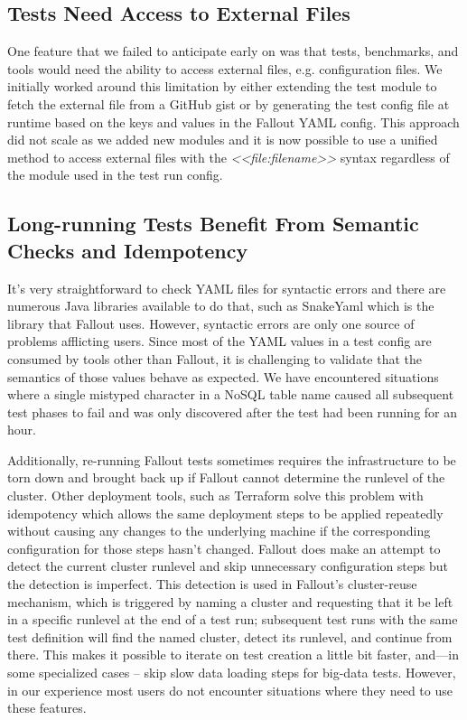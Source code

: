 \documentclass[a4paper,fleqn]{cas-dc}
\begin{document}
\subsection{Tests Need Access to External Files}

One feature that we failed to anticipate early on was that tests, benchmarks, and tools would need
the ability to access external files, e.g. configuration files. We initially worked around this
limitation by either extending the test module to fetch the external file from a GitHub gist or by
generating the test config file at runtime based on the keys and values in the Fallout YAML config.
This approach did not scale as we added new modules and it is now possible to use a unified method
to access external files with the \emph{<<file:filename>>} syntax regardless of the module used in
the test run config.

\subsection{Long-running Tests Benefit From Semantic Checks and Idempotency}


It's very straightforward to check YAML files for syntactic errors and there are numerous Java
libraries available to do that, such as SnakeYaml \cite{SNAKE} which is the library that Fallout uses.
However, syntactic errors are only one source of problems afflicting users. Since most of the YAML
values in a test config are consumed by tools other than Fallout, it is challenging to validate that
the semantics of those values behave as expected. We have encountered situations where a single
mistyped character in a NoSQL table name caused all subsequent test phases to fail and was only
discovered after the test had been running for an hour.

Additionally, re-running Fallout tests sometimes requires the infrastructure to be torn down and
brought back up if Fallout cannot determine the runlevel of the cluster. Other deployment tools,
such as Terraform \cite{TERRAFORM} solve this problem with idempotency which allows the same deployment
steps to be applied repeatedly without causing any changes to the underlying machine if the
corresponding configuration for those steps hasn’t changed. Fallout does make an attempt to detect
the current cluster runlevel and skip unnecessary configuration steps but the detection is
imperfect. This detection is used in Fallout’s cluster-reuse mechanism, which is triggered by naming
a cluster and requesting that it be left in a specific runlevel at the end of a test run; subsequent
test runs with the same test definition will find the named cluster, detect its runlevel, and
continue from there. This makes it possible to iterate on test creation a little bit faster, and—in
some specialized cases -- skip slow data loading steps for big-data tests. However, in our experience
most users do not encounter situations where they need to use these features.
\end{document}
